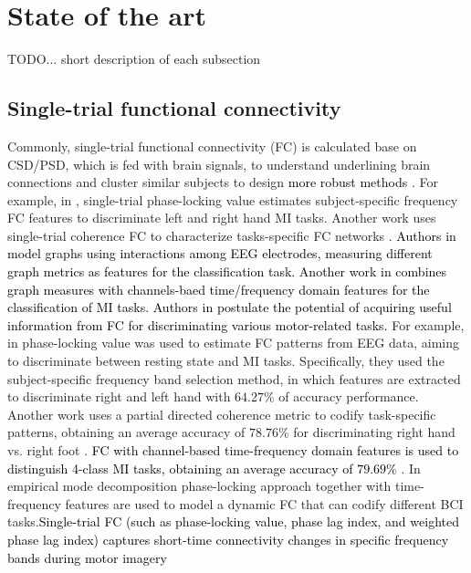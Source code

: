 \section{State of the art}

TODO... short description of each subsection

\subsection{Single-trial functional connectivity}

Commonly, single-trial functional connectivity (FC) is calculated base on CSD/PSD, which is fed with brain signals, to understand underlining brain connections and cluster similar subjects to design \textcolor{black}{ more robust methods \cite{seghier2018interpreting}.}  For example, in \cite{shamsi2021early}, single-trial phase-locking value estimates subject-specific frequency FC features to discriminate left and right hand MI tasks. Another work uses single-trial coherence FC to characterize tasks-specific FC networks \cite{rodrigues2019space}. \textcolor{black}{Authors in \cite{stefano2018can} model graphs using interactions among EEG electrodes, measuring different graph metrics as features for the classification task. Another work in \cite{ai2019feature} combines graph measures with channels-baed time/frequency domain features for the classification of MI tasks. Authors in \cite{shamsi2021early} postulate the potential of acquiring useful information from FC for discriminating various motor-related tasks.} For example, in \cite{gonuguntla2016event} phase-locking value was used to estimate FC patterns from EEG data, aiming to discriminate between resting state and MI tasks. Specifically, they used the subject-specific frequency band selection method, in which features are extracted to discriminate right and left hand with $64.27\%$ of accuracy performance. Another work uses a partial directed coherence metric to codify task-specific patterns, obtaining an average accuracy of $78.76\%$ for discriminating right hand vs. right foot \cite{gaxiola2017using}. \textcolor{black}{FC with channel-based time-frequency domain features is used to distinguish 4-class MI tasks, obtaining an average accuracy of $79.69\%$ \cite{ai2019feature}}. In \cite{daly2012brain} empirical mode decomposition phase-locking approach together with time-frequency features are used to model a dynamic FC that can codify different BCI tasks.\textcolor{black}{Single-trial FC (such as phase-locking value, phase lag index, and weighted phase lag index) captures short-time connectivity changes in specific frequency bands during motor imagery \cite{shamsi2021early}}


